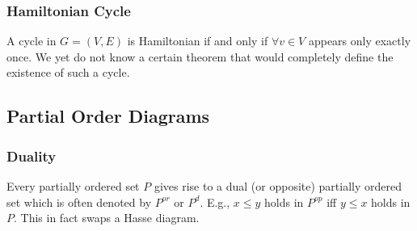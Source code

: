 \documentclass[a4paper]{article}
\theoremstyle{plain}
\theoremstyle{definition}
\newtheorem{defn}{Definition}[section]
\theoremstyle{remark}
\begin{document}
\subsubsection{Hamiltonian Cycle}
\begin{tcolorbox}[colback=black!3!white,colframe=black!60!white,title=\begin{defn}Hamiltonian Cycles \label{Hamiltonian Cycles}\end{defn}]
A cycle in $G= (V,E)$ is Hamiltonian if and only if $\forall v \in V$ appears only exactly once. We yet do not know a certain theorem that would completely define the existence of such a cycle. 
\end{tcolorbox}
\subsection{Partial Order Diagrams}
\subsubsection{Duality}
Every partially ordered set $P$ gives rise to a dual (or opposite) partially ordered set which is often denoted by $P^{or}$ or $P^{d}$. E.g., $x\le y$ holds in $P^{op}$ iff $y\le x$ holds in $P$. This in fact swaps a Hasse diagram.
\end{document}
